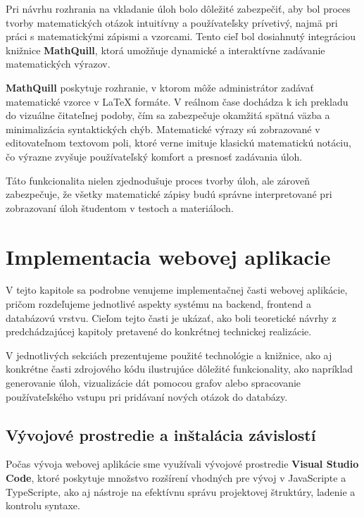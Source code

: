 Pri návrhu rozhrania na vkladanie úloh bolo dôležité zabezpečiť, aby bol proces tvorby matematických otázok intuitívny a používateľsky prívetivý, najmä pri práci s matematickými zápismi a vzorcami.
 Tento cieľ bol dosiahnutý integráciou knižnice \textbf{MathQuill}, ktorá umožňuje dynamické a interaktívne zadávanie matematických výrazov.

\textbf{MathQuill} poskytuje rozhranie, v ktorom môže administrátor zadávať matematické vzorce v LaTeX formáte. 
V reálnom čase dochádza k ich prekladu do vizuálne čitateľnej podoby, čím sa zabezpečuje okamžitá spätná väzba a minimalizácia syntaktických chýb.
 Matematické výrazy sú zobrazované v editovateľnom textovom poli, ktoré verne imituje klasickú matematickú notáciu, čo výrazne zvyšuje používateľský komfort a presnosť zadávania úloh.

Táto funkcionalita nielen zjednodušuje proces tvorby úloh, ale zároveň zabezpečuje, že všetky matematické zápisy budú správne interpretované pri zobrazovaní úloh študentom v testoch a materiáloch.




 \section{Implementacia webovej aplikacie}
 V tejto kapitole sa podrobne venujeme implementačnej časti webovej aplikácie, pričom rozdeľujeme jednotlivé aspekty systému na backend, frontend a databázovú vrstvu.
  Cieľom tejto časti je ukázať, ako boli teoretické návrhy z predchádzajúcej kapitoly pretavené do konkrétnej technickej realizácie.

 V jednotlivých sekciách prezentujeme použité technológie a knižnice, ako aj konkrétne časti zdrojového kódu ilustrujúce dôležité funkcionality, 
 ako napríklad generovanie úloh, vizualizácie dát pomocou grafov alebo spracovanie používateľského vstupu pri pridávaní nových otázok do databázy.

 \subsection{Vývojové prostredie a inštalácia závislostí}

 Počas vývoja webovej aplikácie sme využívali vývojové prostredie \textbf{Visual Studio Code}\cite{vscode}, ktoré poskytuje množstvo rozšírení vhodných pre vývoj v JavaScripte a TypeScripte, ako aj nástroje na efektívnu správu projektovej štruktúry, ladenie a kontrolu syntaxe.
 
